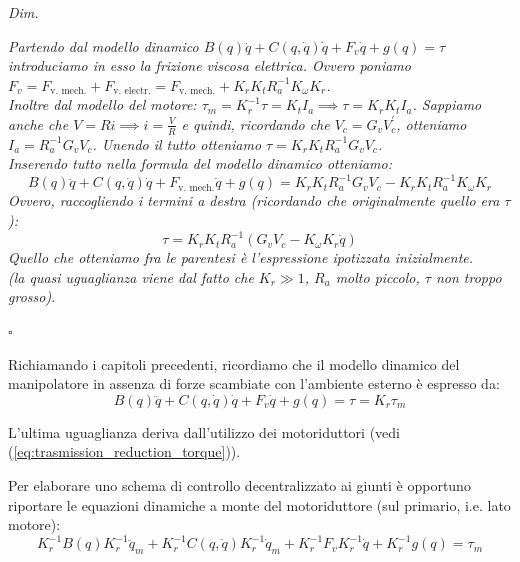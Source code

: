 \begin{mdframed}[leftmargin=15pt, rightmargin=15pt, leftline=false, rightline=false]
\textit{Dim.}

\textit{
Partendo dal modello dinamico {\boldmath$B(q)\ddot{q} + C(q, \dot{q})\dot{q} + F_v\dot{q} + g(q) = \tau$} introduciamo in esso la frizione viscosa elettrica. Ovvero poniamo {\boldmath$F_v = F_\text{v. mech.} + F_\text{v. electr.} = F_\text{v. mech.} + K_rK_tR_a^{-1}K_\omega K_r$}. \\
Inoltre dal modello del motore: 
{\boldmath$\tau_m = K_r^{-1} \tau = K_t I_a \implies \tau = K_r K_t I_a$}. Sappiamo anche che $V = Ri \implies i = \frac{V}{R}$ e quindi, ricordando che {\boldmath$V_c = G_v V_c^{'}$}, otteniamo {\boldmath $I_a = R_a^{-1}G_v V_c$}. Unendo il tutto otteniamo {\boldmath $\tau = K_r K_t R_a^{-1}G_v V_c$}.\\
Inserendo tutto nella formula del modello dinamico otteniamo:
\boldmath
$$
B(q)\ddot{q} + C(q, \dot{q})\dot{q} + F_{\text{v. mech.}}\dot{q} + g(q) = K_r K_t R_a^{-1}G_v V_c - K_rK_tR_a^{-1}K_\omega K_r
$$
Ovvero, raccogliendo i termini a destra (ricordando che originalmente quello era $\tau$):
$$
\tau =  K_r K_t R_a^{-1}(G_v V_c - K_\omega K_r \dot{q})
$$
Quello che otteniamo fra le parentesi è l'espressione ipotizzata inizialmente.\\
(la quasi uguaglianza viene dal fatto che $K_r \gg 1$, $R_a$ molto piccolo, $\tau$ non troppo grosso).
}

\raggedleft $\square$
\end{mdframed}


\vspace*{25pt}



Richiamando i capitoli precedenti, ricordiamo che il modello dinamico del manipolatore in assenza di forze scambiate con l’ambiente esterno è espresso da:
\boldmath
\begin{equation}\label{eq:dynamic_no_ext_forces}
B(q)\ddot{q} + C(q, \dot{q})\dot{q} + F_v\dot{q} + g(q) = \tau = K_r \tau_m
\end{equation}
\unboldmath

L'ultima uguaglianza deriva dall'utilizzo dei motoriduttori (vedi (\ref{eq:trasmission_reduction_torque})).

Per elaborare uno schema di controllo decentralizzato ai giunti è opportuno riportare le equazioni dinamiche a monte del motoriduttore (sul primario, i.e. lato motore):
\boldmath
$$
K_r^{-1}B(q)K_r^{-1}\ddot{q}_m + K_r^{-1}C(q, \dot{q})K_r^{-1}\dot{q}_m + K_r^{-1}F_vK_r^{-1}\dot{q} + K_r^{-1}g(q) = \tau_m
$$
\unboldmath

